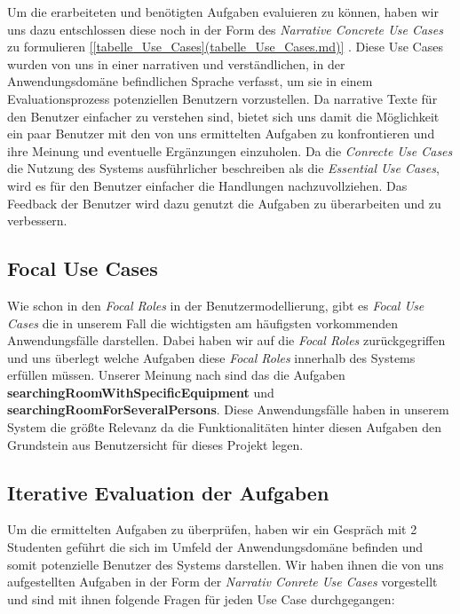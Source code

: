 Um die erarbeiteten und benötigten Aufgaben evaluieren zu können, haben wir
uns dazu entschlossen diese noch in der Form des \textit{Narrative Concrete Use Cases}
zu formulieren \ref{[tabelle_Use_Cases](tabelle_Use_Cases.md)} \citep[Kapitel 5]{softwareForUse}.
Diese Use Cases wurden von uns in einer narrativen und verständlichen, in der
Anwendungsdomäne befindlichen Sprache verfasst, um sie in einem
Evaluationsprozess potenziellen Benutzern vorzustellen.
Da narrative Texte für den Benutzer einfacher zu verstehen sind, bietet sich uns
damit die Möglichkeit ein paar Benutzer mit den von uns ermittelten Aufgaben zu
konfrontieren und ihre Meinung und eventuelle Ergänzungen einzuholen.
Da die \textit{Conrecte Use Cases} die Nutzung des Systems ausführlicher beschreiben
als die \textit{Essential Use Cases}, wird es für den Benutzer einfacher die
Handlungen nachzuvollziehen.
Das Feedback der Benutzer wird dazu genutzt die Aufgaben zu überarbeiten und
zu verbessern. 


\subsection{Focal Use Cases}
\label{sec:Focal_Use_Cases}
Wie schon in den \textit{Focal Roles} in der Benutzermodellierung, gibt es
\textit{Focal Use Cases} die in unserem Fall die wichtigsten \bzw am häufigsten
vorkommenden Anwendungsfälle darstellen. Dabei haben wir auf die \textit{Focal Roles}
zurückgegriffen und uns überlegt welche Aufgaben diese \textit{Focal Roles}
innerhalb des Systems erfüllen müssen.
Unserer Meinung nach sind das die Aufgaben \textbf{searchingRoomWithSpecificEquipment}
und \textbf{searchingRoomForSeveralPersons}. Diese Anwendungsfälle haben in unserem
System die größte Relevanz da die Funktionalitäten hinter diesen Aufgaben den
Grundstein aus Benutzersicht für dieses Projekt legen. 


\subsection{Iterative Evaluation der Aufgaben}
\label{Iterative_Evaluation_der_Aufgaben}

Um die ermittelten Aufgaben zu überprüfen, haben wir ein Gespräch mit
2 Studenten geführt die sich im Umfeld der Anwendungsdomäne befinden und somit
potenzielle Benutzer des Systems darstellen. Wir haben ihnen die von uns
aufgestellten Aufgaben in der Form der \textit{Narrativ Conrete Use Cases} vorgestellt
und sind mit ihnen folgende Fragen für jeden Use Case durchgegangen:

